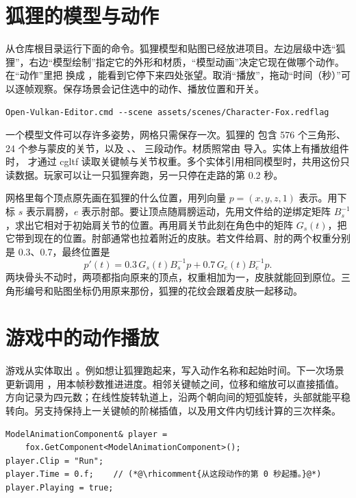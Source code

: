 \section{狐狸的模型与动作}
从仓库根目录运行下面的命令。狐狸模型和贴图已经放进项目。左边层级中选“狐狸”，右边“模型绘制”指定它的外形和材质，“模型动画”决定它现在做哪个动作。在“动作”里把  换成 ，能看到它停下来四处张望。取消“播放”，拖动“时间（秒）”可以逐帧观察。保存场景会记住选中的动作、播放位置和开关。

\begin{lstlisting}[style=besidetext]
Open-Vulkan-Editor.cmd --scene assets/scenes/Character-Fox.redflag
\end{lstlisting}


一个模型文件可以存许多姿势，网格只需保存一次。狐狸的  包含 576 个三角形、24 个参与蒙皮的关节，以及 、、 三段动作。材质照常由  导入。实体上有播放组件时， 才通过 cgltf 读取关键帧与关节权重。多个实体引用相同模型时，共用这份只读数据。玩家可以让一只狐狸奔跑，另一只停在走路的第 0.2 秒。

网格里每个顶点原先画在狐狸的什么位置，用列向量 $p=(x,y,z,1)$ 表示。用下标 $s$ 表示肩膀，$e$ 表示肘部。要让顶点随肩膀运动，先用文件给的逆绑定矩阵 $B_s^{-1}$，求出它相对于初始肩关节的位置。再用肩关节此刻在角色中的矩阵 $G_s(t)$，把它带到现在的位置。肘部通常也拉着附近的皮肤。若文件给肩、肘的两个权重分别是 0.3、0.7，最终位置是
\[
p'(t)=0.3\,G_s(t)B_s^{-1}p+
      0.7\,G_e(t)B_e^{-1}p .
\]
两块骨头不动时，两项都指向原来的顶点，权重相加为一，皮肤就能回到原位。三角形编号和贴图坐标仍用原来那份，狐狸的花纹会跟着皮肤一起移动。

\clearpage
\section{游戏中的动作播放}
游戏从实体取出 。例如想让狐狸跑起来，写入动作名称和起始时间。下一次场景更新调用 ，用本帧秒数推进进度。相邻关键帧之间，位移和缩放可以直接插值。方向记录为四元数；在线性旋转轨道上，沿两个朝向间的短弧旋转，头部就能平稳转向。另支持保持上一关键帧的阶梯插值，以及用文件内切线计算的三次样条。

\begin{lstlisting}[style=besidetext]
ModelAnimationComponent& player =
    fox.GetComponent<ModelAnimationComponent>();
player.Clip = "Run";
player.Time = 0.f;    // (*@\rhicomment{从这段动作的第 0 秒起播。}@*)
player.Playing = true;
\end{lstlisting}

